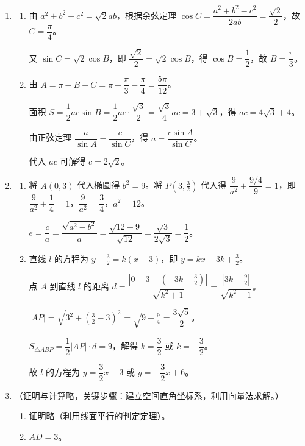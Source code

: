 \documentclass[12pt,a4paper]{article}
\begin{document}
\begin{enumerate}[label=\arabic*.]
\item 
\begin{enumerate}[label=(\arabic*)]
\item 由 $a^2+b^2-c^2=\sqrt{2}ab$，根据余弦定理 $\cos C=\dfrac{a^2+b^2-c^2}{2ab}=\dfrac{\sqrt{2}}{2}$，故 $C=\dfrac{\pi}{4}$。

又 $\sin C=\sqrt{2}\cos B$，即 $\dfrac{\sqrt{2}}{2}=\sqrt{2}\cos B$，得 $\cos B=\dfrac{1}{2}$，故 $B=\dfrac{\pi}{3}$。

\item 由 $A=\pi-B-C=\pi-\dfrac{\pi}{3}-\dfrac{\pi}{4}=\dfrac{5\pi}{12}$。

面积 $S=\dfrac{1}{2}ac\sin B=\dfrac{1}{2}ac\cdot\dfrac{\sqrt{3}}{2}=\dfrac{\sqrt{3}}{4}ac=3+\sqrt{3}$，得 $ac=4\sqrt{3}+4$。

由正弦定理 $\dfrac{a}{\sin A}=\dfrac{c}{\sin C}$，得 $a=\dfrac{c\sin A}{\sin C}$。

代入 $ac$ 可解得 $c=2\sqrt{2}$。
\end{enumerate}

\item 
\begin{enumerate}[label=(\arabic*)]
\item 将 $A(0,3)$ 代入椭圆得 $b^2=9$。将 $P(3,\frac{3}{2})$ 代入得 $\dfrac{9}{a^2}+\dfrac{9/4}{9}=1$，即 $\dfrac{9}{a^2}+\dfrac{1}{4}=1$，$\dfrac{9}{a^2}=\dfrac{3}{4}$，$a^2=12$。

$e=\dfrac{c}{a}=\dfrac{\sqrt{a^2-b^2}}{a}=\dfrac{\sqrt{12-9}}{\sqrt{12}}=\dfrac{\sqrt{3}}{2\sqrt{3}}=\dfrac{1}{2}$。

\item 直线 $l$ 的方程为 $y-\frac{3}{2}=k(x-3)$，即 $y=kx-3k+\frac{3}{2}$。

点 $A$ 到直线 $l$ 的距离 $d=\dfrac{|0-3-(-3k+\frac{3}{2})|}{\sqrt{k^2+1}}=\dfrac{|3k-\frac{9}{2}|}{\sqrt{k^2+1}}$。

$|AP|=\sqrt{3^2+(\frac{3}{2}-3)^2}=\sqrt{9+\frac{9}{4}}=\dfrac{3\sqrt{5}}{2}$。

$S_{\triangle ABP}=\dfrac{1}{2}|AP|\cdot d=9$，解得 $k=\dfrac{3}{2}$ 或 $k=-\dfrac{3}{2}$。

故 $l$ 的方程为 $y=\dfrac{3}{2}x-3$ 或 $y=-\dfrac{3}{2}x+6$。
\end{enumerate}

\item （证明与计算略，关键步骤：建立空间直角坐标系，利用向量法求解。）
\begin{enumerate}[label=(\arabic*)]
\item 证明略（利用线面平行的判定定理）。
\item $AD=3$。
\end{enumerate}


\end{enumerate}
\end{document}
